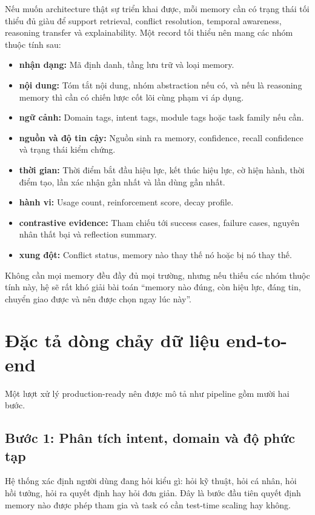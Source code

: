 \documentclass[a4paper,12pt]{article}
\begin{document}
Nếu muốn architecture thật sự triển khai được, mỗi memory cần có trạng thái tối thiểu đủ giàu để support retrieval, conflict resolution, temporal awareness, reasoning transfer và explainability. Một record tối thiểu nên mang các nhóm thuộc tính sau:
\begin{itemize}
    \item \textbf{nhận dạng:} Mã định danh, tầng lưu trữ và loại memory.
    \item \textbf{nội dung:} Tóm tắt nội dung, nhóm abstraction nếu có, và nếu là reasoning memory thì cần có chiến lược cốt lõi cùng phạm vi áp dụng.
    \item \textbf{ngữ cảnh:} Domain tags, intent tags, module tags hoặc task family nếu cần.
    \item \textbf{nguồn và độ tin cậy:} Nguồn sinh ra memory, confidence, recall confidence và trạng thái kiểm chứng.
    \item \textbf{thời gian:} Thời điểm bắt đầu hiệu lực, kết thúc hiệu lực, cờ hiện hành, thời điểm tạo, lần xác nhận gần nhất và lần dùng gần nhất.
    \item \textbf{hành vi:} Usage count, reinforcement score, decay profile.
    \item \textbf{contrastive evidence:} Tham chiếu tới success cases, failure cases, nguyên nhân thất bại và reflection summary.
    \item \textbf{xung đột:} Conflict status, memory nào thay thế nó hoặc bị nó thay thế.
\end{itemize}

Không cần mọi memory đều đầy đủ mọi trường, nhưng nếu thiếu các nhóm thuộc tính này, hệ sẽ rất khó giải bài toán ``memory nào đúng, còn hiệu lực, đáng tin, chuyển giao được và nên được chọn ngay lúc này''.

\section{Đặc tả dòng chảy dữ liệu end-to-end}

Một lượt xử lý production-ready nên được mô tả như pipeline gồm mười hai bước.

\subsection*{Bước 1: Phân tích intent, domain và độ phức tạp}

Hệ thống xác định người dùng đang hỏi kiểu gì: hỏi kỹ thuật, hỏi cá nhân, hỏi hồi tưởng, hỏi ra quyết định hay hỏi đơn giản. Đây là bước đầu tiên quyết định memory nào được phép tham gia và task có cần test-time scaling hay không.
\end{document}
